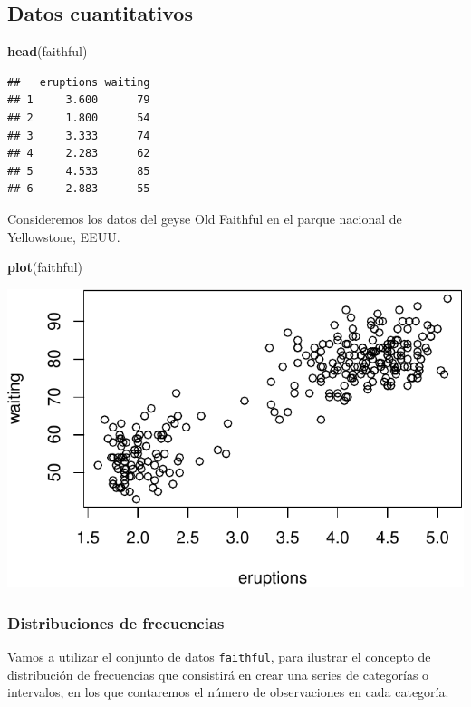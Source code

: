 \documentclass[]{article}
\newenvironment{Shaded}{\begin{snugshade}}{\end{snugshade}}
\newcommand{\KeywordTok}[1]{\textcolor[rgb]{0.13,0.29,0.53}{\textbf{{#1}}}}
\newcommand{\NormalTok}[1]{{#1}}
\numberwithin{equation}{section}
\begin{document}
\subsection{Datos cuantitativos}\label{datos-cuantitativos}

\begin{Shaded}
\begin{Highlighting}[]
\KeywordTok{head}\NormalTok{(faithful)}
\end{Highlighting}
\end{Shaded}

\begin{verbatim}
##   eruptions waiting
## 1     3.600      79
## 2     1.800      54
## 3     3.333      74
## 4     2.283      62
## 5     4.533      85
## 6     2.883      55
\end{verbatim}

Consideremos los datos del geyse Old Faithful en el parque nacional de
Yellowstone, EEUU.

\begin{Shaded}
\begin{Highlighting}[]
\KeywordTok{plot}\NormalTok{(faithful)}
\end{Highlighting}
\end{Shaded}

\includegraphics{tema1_files/figure-latex/unnamed-chunk-102-1.pdf}

\subsubsection{Distribuciones de
frecuencias}\label{distribuciones-de-frecuencias}

Vamos a utilizar el conjunto de datos \texttt{faithful}, para ilustrar
el concepto de distribución de frecuencias que consistirá en crear una
series de categorías o intervalos, en los que contaremos el número de
observaciones en cada categoría.
\end{document}
